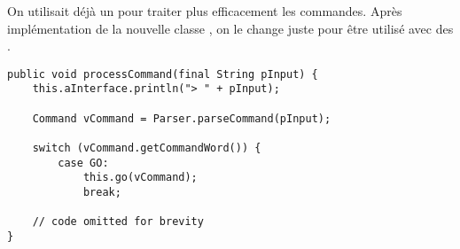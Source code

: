 \begin{exercise}[subtitle=zuul-with-enums-v1]

On utilisait déjà un  pour traiter plus efficacement les commandes. Après implémentation de la nouvelle classe , on le change juste pour être utilisé avec des .

\begin{verbatim}
public void processCommand(final String pInput) {
    this.aInterface.println("> " + pInput);

    Command vCommand = Parser.parseCommand(pInput);

    switch (vCommand.getCommandWord()) {
        case GO:
            this.go(vCommand);
            break;
            
    // code omitted for brevity
}
\end{verbatim}
\end{exercise}

\setcounter{exercise}{39}

